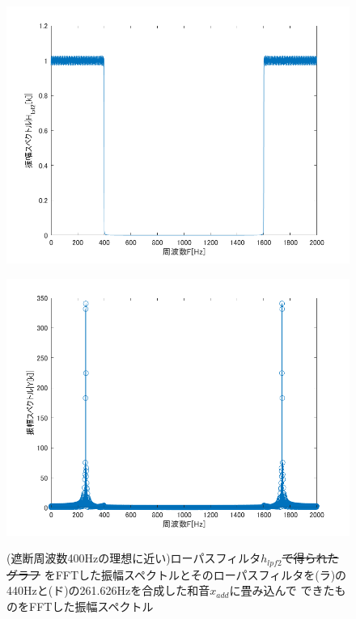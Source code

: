 \documentclass[11pt, a4paper, titlepage]{ltjsarticle}
\begin{document}
\begin{figure}[h]
    \begin{center}
    \begin{minipage}[t]{0.48\columnwidth}
        \includegraphics[width=\columnwidth]{figures/2-3lpf2.png}
        \label{fign:2-3lpf2}
    \end{minipage}
    \begin{minipage}[t]{0.48\columnwidth}
        \includegraphics[width=\columnwidth]{figures/2-3y2.png}
        \label{fign:2-3y2}
    \end{minipage}
    \end{center}
    \caption{(遮断周波数400Hzの理想に近い)ローパスフィルタ$h_{lpf2}$\sout{で得られたグラフ}
    をFFTした振幅スペクトルとそのローパスフィルタを(ラ)の440Hzと(ド)の261.626Hzを合成した和音$x_{add}$に畳み込んで
    できたものをFFTした振幅スペクトル}
\end{figure}
\end{document}
